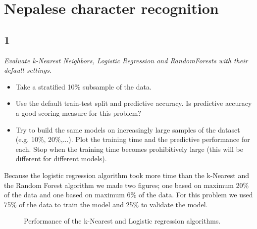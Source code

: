 \documentclass[a4paper,12pt]{article}
\begin{document}

\tableofcontents %




\section{Nepalese character recognition}
\subsection{1}
{\it Evaluate k-Nearest Neighbors, Logistic Regression and RandomForests with their default
settings.
\begin{itemize}
\item{Take a stratified 10\% subsample of the data.}
\item{Use the default train-test split and predictive accuracy. Is predictive accuracy a good scoring measure for this problem?}
\item{Try to build the same models on increasingly large samples of the dataset (e.g. 10\%,
20\%,...). Plot the training time and the predictive performance for each. Stop when the
training time becomes prohibitively large (this will be different for different models).}
\end{itemize}
\textnormal{Because the logistic regression algorithm took more time than the k-Nearest and the Random Forest algorithm we made two figures; one based on maximum 20\% of the data and one based on maximum 6\% of the data. For this problem we used 75\% of the data to train the model and 25\% to validate the model.}

\begin{figure}[H]
\hfill
{}
\hfill
\caption{Performance of the k-Nearest and Logistic regression algorithms. }
\label{Q21a}
\end{figure}

}
\end{document}
